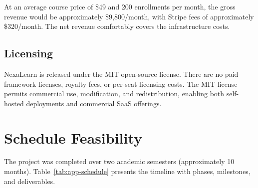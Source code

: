 At an average course price of \$49 and 200 enrollments per month, the gross revenue would be approximately \$9,800/month, with Stripe fees of approximately \$320/month. The net revenue comfortably covers the infrastructure costs.

\subsection{Licensing}

NexaLearn is released under the MIT open-source license. There are no paid framework licenses, royalty fees, or per-seat licensing costs. The MIT license permits commercial use, modification, and redistribution, enabling both self-hosted deployments and commercial SaaS offerings.

\section{Schedule Feasibility}
\label{sec:app-sched-feasibility}

The project was completed over two academic semesters (approximately 10 months). Table~\ref{tab:app-schedule} presents the timeline with phases, milestones, and deliverables.

